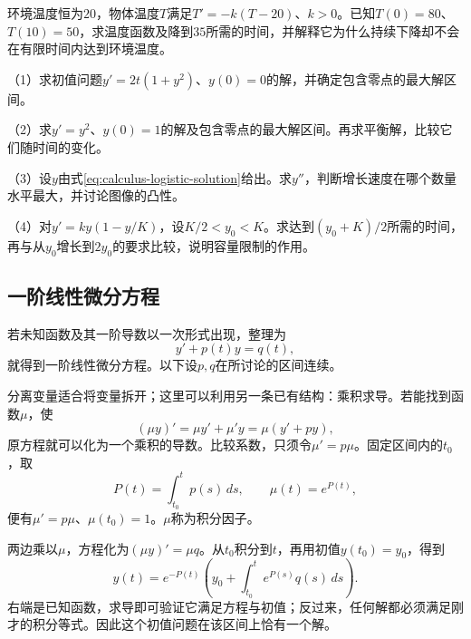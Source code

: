 \begin{example}
环境温度恒为\(20\)，物体温度\(T\)满足\(T'=-k(T-20)\)、\(k>0\)。已知\(T(0)=80\)、\(T(10)=50\)，求温度函数及降到\(35\)所需的时间，并解释它为什么持续下降却不会在有限时间内达到环境温度。
\end{example}

\begin{exercise}
\mbox{}\par\nobreak

（1）求初值问题\(y'=2t(1+y^2)\)、\(y(0)=0\)的解，并确定包含零点的最大解区间。

（2）求\(y'=y^2\)、\(y(0)=1\)的解及包含零点的最大解区间。再求平衡解，比较它们随时间的变化。

（3）设\(y\)由式\eqref{eq:calculus-logistic-solution}给出。求\(y''\)，判断增长速度在哪个数量水平最大，并讨论图像的凸性。

（4）对\(y'=ky(1-y/K)\)，设\(K/2<y_0<K\)。求达到\((y_0+K)/2\)所需的时间，再与从\(y_0\)增长到\(2y_0\)的要求比较，说明容量限制的作用。
\end{exercise}

\subsection{一阶线性微分方程}

若未知函数及其一阶导数以一次形式出现，整理为
\begin{equation}\label{eq:calculus-linear-ode}
 y'+p(t)y=q(t),
\end{equation}
就得到{\heiti{}一阶线性微分方程}。以下设\(p,q\)在所讨论的区间连续。

分离变量适合将变量拆开；这里可以利用另一条已有结构：乘积求导。若能找到函数\(\mu\)，使
\begin{equation*}
 (\mu y)'=\mu y'+\mu' y=\mu(y'+py),
\end{equation*}
原方程就可以化为一个乘积的导数。比较系数，只须令\(\mu'=p\mu\)。固定区间内的\(t_0\)，取
\begin{equation*}
 P(t)=\int_{t_0}^t p(s)\,ds,\qquad \mu(t)=e^{P(t)},
\end{equation*}
便有\(\mu'=p\mu\)、\(\mu(t_0)=1\)。\(\mu\)称为{\heiti{}积分因子}。

两边乘以\(\mu\)，方程化为\((\mu y)'=\mu q\)。从\(t_0\)积分到\(t\)，再用初值\(y(t_0)=y_0\)，得到
\begin{equation}\label{eq:calculus-linear-ode-solution}
 y(t)=e^{-P(t)}\left(y_0+\int_{t_0}^t e^{P(s)}q(s)\,ds\right).
\end{equation}
右端是已知函数，求导即可验证它满足方程与初值；反过来，任何解都必须满足刚才的积分等式。因此这个初值问题在该区间上恰有一个解。

